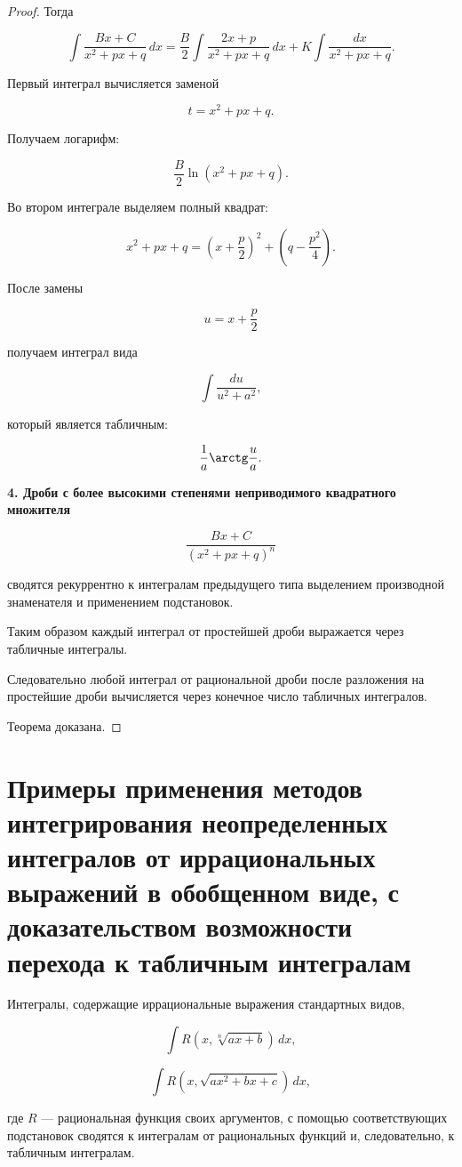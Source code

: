 \documentclass[14pt]{extreport}
\begin{document}
\begin{proof}
Тогда

\[
\int
\frac{Bx+C}
     {x^2+px+q}
\,dx
=
\frac{B}{2}
\int
\frac{2x+p}
     {x^2+px+q}
\,dx
+
K
\int
\frac{dx}
     {x^2+px+q}.
\]

Первый интеграл вычисляется заменой

\[
t=x^2+px+q.
\]

Получаем логарифм:

\[
\frac{B}{2}\ln(x^2+px+q).
\]

Во втором интеграле выделяем полный квадрат:

\[
x^2+px+q
=
\left(x+\frac p2\right)^2
+
\left(q-\frac{p^2}{4}\right).
\]

После замены

\[
u=x+\frac p2
\]

получаем интеграл вида

\[
\int\frac{du}{u^2+a^2},
\]

который является табличным:

\[
\frac1a\arctg\frac ua.
\]

\medskip

\textbf{4. Дроби с более высокими степенями неприводимого квадратного множителя}

\[
\frac{Bx+C}
     {(x^2+px+q)^n}
\]

сводятся рекуррентно к интегралам предыдущего типа
выделением производной знаменателя и применением подстановок.

Таким образом каждый интеграл от простейшей дроби выражается через табличные интегралы.

Следовательно любой интеграл от рациональной дроби
после разложения на простейшие дроби вычисляется через конечное число табличных интегралов.

Теорема доказана.
\end{proof}

\chapter{Примеры применения методов интегрирования неопределенных интегралов от иррациональных выражений в обобщенном виде, с доказательством возможности перехода
к табличным интегралам}
\begin{theorem}
Интегралы, содержащие иррациональные выражения стандартных видов,

\[
\int R\!\left(x,\sqrt[n]{ax+b}\right)\,dx,
\]

\[
\int R\!\left(x,\sqrt{ax^2+bx+c}\right)\,dx,
\]

где $R$ --- рациональная функция своих аргументов,
с помощью соответствующих подстановок сводятся к интегралам от рациональных функций и, следовательно, к табличным интегралам.
\end{theorem}
\end{document}
